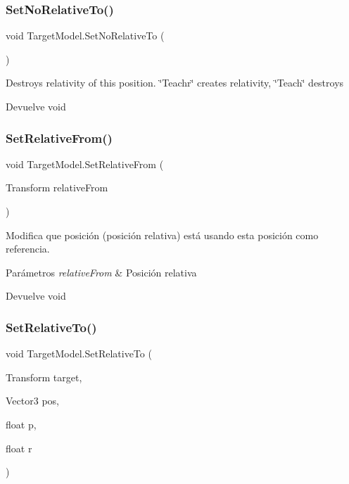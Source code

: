 \subsubsection{\texorpdfstring{SetNoRelativeTo()}{SetNoRelativeTo()}}
{\footnotesize\ttfamily void Target\+Model.\+Set\+No\+Relative\+To (\begin{DoxyParamCaption}{ }\end{DoxyParamCaption})\hspace{0.3cm}{\ttfamily [inline]}}

Destroys relativity of this position. \char`\"{}\+Teachr\char`\"{} creates relativity, \char`\"{}\+Teach\char`\"{} destroys \begin{DoxyReturn}{Devuelve}
void 
\end{DoxyReturn}
\mbox{\label{class_target_model_a0a23959221104882e778ae3e7d10fe11}} 
\subsubsection{\texorpdfstring{SetRelativeFrom()}{SetRelativeFrom()}}
{\footnotesize\ttfamily void Target\+Model.\+Set\+Relative\+From (\begin{DoxyParamCaption}\item[{Transform}]{relative\+From }\end{DoxyParamCaption})\hspace{0.3cm}{\ttfamily [inline]}}

Modifica que posición (posición relativa) está usando esta posición como referencia. 
\begin{DoxyParams}{Parámetros}
{\em relative\+From} & Posición relativa \\
\hline
\end{DoxyParams}
\begin{DoxyReturn}{Devuelve}
void 
\end{DoxyReturn}
\mbox{\label{class_target_model_ad3bc453cd76840108e7b7ffdd783c175}} 
\subsubsection{\texorpdfstring{SetRelativeTo()}{SetRelativeTo()}}
{\footnotesize\ttfamily void Target\+Model.\+Set\+Relative\+To (\begin{DoxyParamCaption}\item[{Transform}]{target,  }\item[{Vector3}]{pos,  }\item[{float}]{p,  }\item[{float}]{r }\end{DoxyParamCaption})\hspace{0.3cm}{\ttfamily [inline]}}

